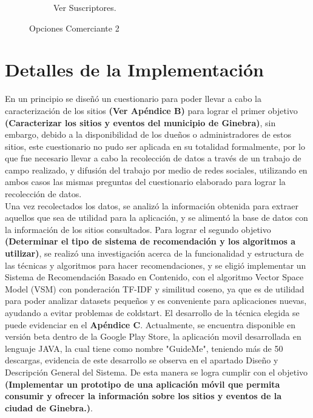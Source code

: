 \documentclass[12pt,letterpaper,openany]{book}
\begin{document}
\begin{figure}[H]
\begin{subfigure}{.4\linewidth}
        \caption{Ver Suscriptores.}
    \end{subfigure}
    \caption{Opciones Comerciante 2}
\end{figure}

\section{Detalles de la Implementación}
En un principio se diseñó un cuestionario para poder llevar a cabo la caracterización de los sitios \textbf{(Ver Apéndice B)} para lograr el primer objetivo \textbf{(Caracterizar los sitios y eventos del municipio de Ginebra)}, sin embargo, debido a la disponibilidad de los dueños o administradores de estos sitios, este cuestionario no pudo ser aplicada en su totalidad formalmente, por lo que fue necesario llevar a cabo la recolección de datos a través de un trabajo de campo realizado, y difusión del trabajo por medio de redes sociales, utilizando en ambos casos las mismas preguntas del cuestionario elaborado para lograr la recolección de datos.\\
Una vez recolectados los datos, se analizó la información obtenida para extraer aquellos que sea de utilidad para la aplicación, y se alimentó la base de datos con la información de los sitios consultados.
\vspace{5mm}\newline
Para lograr el segundo objetivo \textbf{(Determinar el tipo de sistema de recomendación y los algoritmos a utilizar)}, se realizó una investigación acerca de la funcionalidad y estructura de las técnicas y algoritmos para hacer recomendaciones, y se eligió implementar un Sistema de Recomendación Basado en Contenido, con el algoritmo Vector Space Model (VSM) con ponderación TF-IDF y similitud coseno, ya que es de utilidad para poder analizar datasets pequeños y es conveniente para aplicaciones nuevas, ayudando a evitar problemas de coldstart. El desarrollo de la técnica elegida se puede evidenciar en el \textbf{Apéndice C}.
\vspace{5mm}\newline
Actualmente, se encuentra disponible en versión beta dentro de la Google Play Store, la aplicación movil desarrollada en lenguaje JAVA, la cual tiene como nombre "GuideMe",  teniendo más de 50 descargas, evidencia de este desarrollo se observa en el apartado Diseño y Descripción General del Sistema. De esta manera se logra cumplir con el objetivo \textbf{(Implementar un prototipo de una aplicación móvil que permita consumir y ofrecer la información sobre los sitios y eventos de la ciudad de Ginebra.)}.
\end{document}
